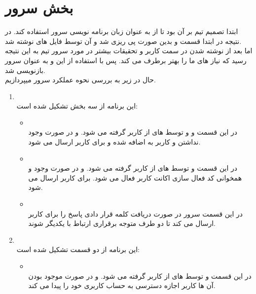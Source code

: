 \documentclass[12pt,onecolumn,a4paper]{article}
\begin{document}
\section{بخش سرور}
ابتدا تصمیم تیم بر آن بود تا از 
به عنوان زبان برنامه نویسی سرور استفاده کند. در نتیجه در ابتدا قسمت
و 
بدین صورت پی ریزی شد و 
آن توسط فایل های 
نوشته شد.
\\
 اما بعد از نوشته شدن 
در سمت کاربر و تحقیقات بیشتر در مورد سرور تیم به این نتیجه رسید که 
نیاز های ما را بهتر برطرف می کند. پس با استفاده از این 
و 
به عنوان 
سرور
بازنویسی شد.
\\
حال در زیر به بررسی نحوه عملکرد سرور میپردازیم.
\begin{enumerate}
\item 
{}
\\
این برنامه از سه بخش تشکیل شده است:
\begin{itemize}
\item 
{}
\\
در این قسمت
و
و
توسط 
های 
از کاربر گرفته می شود. و در صورت وجود نداشتن 
و
کاربر به 
اضافه شده و 
برای کاربر ارسال می شود.
\item {}
\\
در این قسمت
و
توسط 
های 
از کاربر گرفته می شود. و در صورت وجود 
و همخوانی کد فعال سازی اکانت کاربر فعال می شود.
برای کاربر ارسال می شود.
\item {}
\\
در این قسمت سرور در صورت دریافت کلمه قرار دادی 
پاسخ 
را برای کاربر ارسال می کند تا دو طرف متوجه برقراری ارتباط با یکدیگر شوند.
\end{itemize}
\item{}
\\
این برنامه از دو قسمت تشکیل شده است:
\begin{itemize}
\item {}
\\
در این قسمت
و
توسط 
های 
از کاربر گرفته می شود. و در صورت موجود بودن آن ها کاربر اجازه دسترسی به حساب کاربری خود را پیدا می کند.


\end{itemize}
\end{enumerate}
\end{document}
